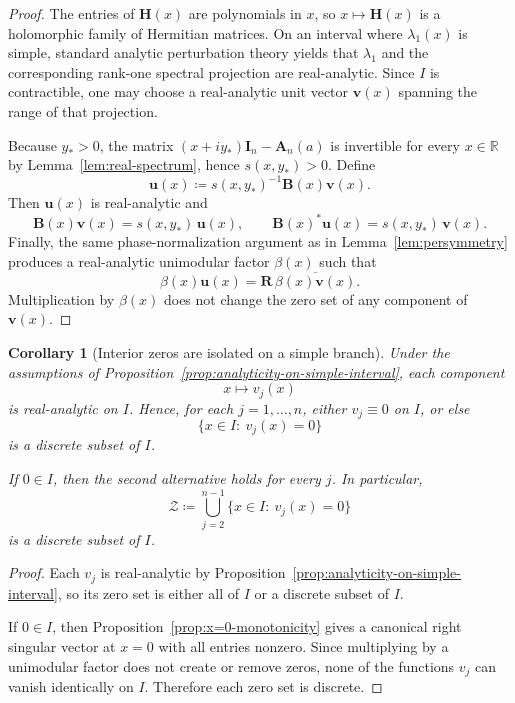 \documentclass[11pt]{article}
\newtheorem{corollary}[theorem]{Corollary}
\begin{document}
\begin{proof}
The entries of \(\mathbf H(x)\) are polynomials in \(x\), so \(x\mapsto \mathbf H(x)\) is a holomorphic family of Hermitian matrices. On an interval where \(\lambda_1(x)\) is simple, standard analytic perturbation theory yields that \(\lambda_1\) and the corresponding rank-one spectral projection are real-analytic. Since \(I\) is contractible, one may choose a real-analytic unit vector \(\mathbf v(x)\) spanning the range of that projection.

Because \(y_*>0\), the matrix \((x+iy_*)\mathbf I_n-\mathbf A_n(a)\) is invertible for every \(x\in\mathbb R\) by Lemma~\ref{lem:real-spectrum}, hence \(s(x,y_*)>0\). Define
\[
\mathbf u(x)\coloneqq s(x,y_*)^{-1}\mathbf B(x)\mathbf v(x).
\]
Then \(\mathbf u(x)\) is real-analytic and
\[
\mathbf B(x)\mathbf v(x)=s(x,y_*)\,\mathbf u(x),
\qquad
\mathbf B(x)^*\mathbf u(x)=s(x,y_*)\,\mathbf v(x).
\]
Finally, the same phase-normalization argument as in Lemma~\ref{lem:persymmetry} produces a real-analytic unimodular factor \(\beta(x)\) such that
\[
\beta(x)\mathbf u(x)=\mathbf R\,\overline{\beta(x)\mathbf v(x)}.
\]
Multiplication by \(\beta(x)\) does not change the zero set of any component of \(\mathbf v(x)\).
\end{proof}

\begin{corollary}[Interior zeros are isolated on a simple branch]\label{cor:isolated-interior-zeros}
Under the assumptions of Proposition~\ref{prop:analyticity-on-simple-interval}, each component
\[
x\longmapsto v_j(x)
\]
is real-analytic on \(I\). Hence, for each \(j=1,\dots,n\), either \(v_j\equiv 0\) on \(I\), or else
\[
\{x\in I:\ v_j(x)=0\}
\]
is a discrete subset of \(I\).

If \(0\in I\), then the second alternative holds for every \(j\). In particular,
\[
\mathcal Z\coloneqq \bigcup_{j=2}^{n-1}\{x\in I:\ v_j(x)=0\}
\]
is a discrete subset of \(I\).
\end{corollary}

\begin{proof}
Each \(v_j\) is real-analytic by Proposition~\ref{prop:analyticity-on-simple-interval}, so its zero set is either all of \(I\) or a discrete subset of \(I\).

If \(0\in I\), then Proposition~\ref{prop:x=0-monotonicity} gives a canonical right singular vector at \(x=0\) with all entries nonzero. Since multiplying by a unimodular factor does not create or remove zeros, none of the functions \(v_j\) can vanish identically on \(I\). Therefore each zero set is discrete.
\end{proof}
\end{document}
